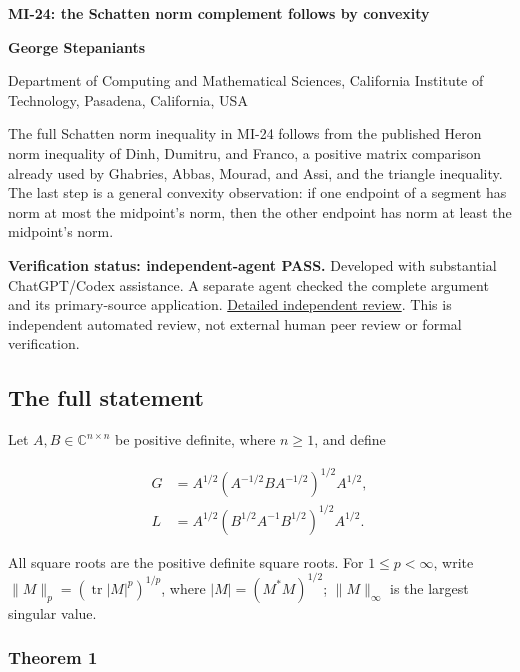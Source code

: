 \documentclass[10pt,a4paper]{article}
\begin{document}
{\raggedright\Large\bfseries MI-24: the Schatten norm complement follows
by convexity\par}
\vspace{0.4em}
{\normalsize\bfseries George Stepaniants\par}
{\small Department of Computing and Mathematical Sciences, California
Institute of Technology, Pasadena, California, USA\par}
\vspace{0.6em}
\pagestyle{plain}

The full Schatten norm inequality in MI-24 follows from the published
Heron norm inequality of Dinh, Dumitru, and Franco, a positive matrix
comparison already used by Ghabries, Abbas, Mourad, and Assi, and the
triangle inequality. The last step is a general convexity observation:
if one endpoint of a segment has norm at most the midpoint's norm, then
the other endpoint has norm at least the midpoint's norm.

\textbf{Verification status: independent-agent PASS.} Developed with
substantial ChatGPT/Codex assistance. A separate agent checked the
complete argument and its primary-source application.
\href{https://github.com/ajt60gaibb/OpenProblemsInNLA/blob/main/references/stepaniants-mi24-2026-09-11/verification/reviews/MI-24-review.md}{Detailed
independent review}. This is independent automated review, not external
human peer review or formal verification.

\subsection{The full statement}\label{the-full-statement}

Let \(A,B\in\mathbb C^{n\times n}\) be positive definite, where
\(n\ge1\), and define

\[
\begin{aligned}
G&=A^{1/2}(A^{-1/2}BA^{-1/2})^{1/2}A^{1/2},\\
L&=A^{1/2}(B^{1/2}A^{-1}B^{1/2})^{1/2}A^{1/2}.
\end{aligned}
\]

All square roots are the positive definite square roots. For
\(1\le p<\infty\), write \(\|M\|_p=(\operatorname{tr}|M|^p)^{1/p}\),
where \(|M|=(M^*M)^{1/2}\); \(\|M\|_\infty\) is the largest singular
value.

\subsubsection{Theorem 1}\label{theorem-1}
\end{document}
